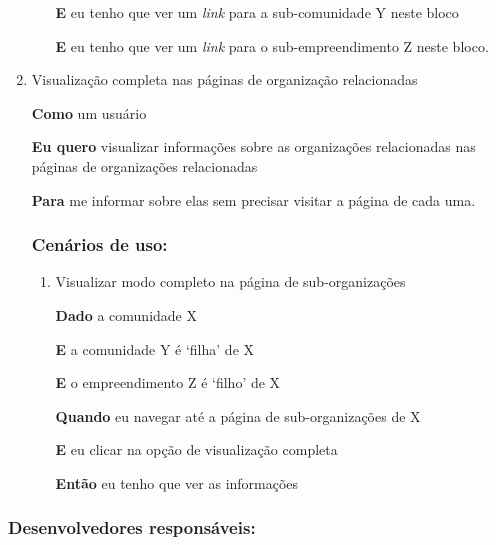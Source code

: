 \begin{enumerate}
\begin{enumerate}
\textbf{E} eu tenho que ver um \textit{link} para a sub-comunidade Y neste
bloco

\textbf{E} eu tenho que ver um \textit{link} para o sub-empreendimento Z neste
bloco.

\end{enumerate}

\item Visualização completa nas páginas de organização relacionadas

\textbf{Como} um usuário

\textbf{Eu quero} visualizar informações sobre as organizações relacionadas nas
páginas de organizações relacionadas

\textbf{Para} me informar sobre elas sem precisar visitar a página de cada uma.

\subsubsection*{Cenários de uso:}

\begin{enumerate}

\item Visualizar modo completo na página de sub-organizações

\textbf{Dado} a comunidade X

\textbf{E} a comunidade Y é `filha' de X

\textbf{E} o empreendimento Z é `filho' de X

\textbf{Quando} eu navegar até a página de sub-organizações de X

\textbf{E} eu clicar na opção de visualização completa

\textbf{Então} eu tenho que ver as informações

\end{enumerate}

\end{enumerate}


\subsubsection*{Desenvolvedores responsáveis:}

